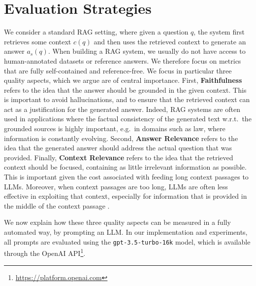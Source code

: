 \documentclass[11pt]{article}
\newcommand{\shahul}[1]{\textcolor{red}{#1}}
\begin{document}
\section{Evaluation Strategies}
\label{sec:eval}
We consider a standard RAG setting, where given a question $q$, the system first retrieves some context $c(q)$ and then uses the retrieved context to generate an answer $a_s(q)$. When building a RAG system, we usually do not have access to human-annotated datasets or reference answers. We therefore focus on metrics that are fully self-contained and reference-free. We focus in particular three quality aspects, which we argue are of central importance. First, \textbf{Faithfulness} refers to the idea that the answer should be grounded in the given context. This is important to avoid hallucinations, and to ensure that the retrieved context can act as a justification for the generated answer. 
Indeed, RAG systems are often used in applications where the factual consistency of the generated text w.r.t.\ the grounded sources is highly important, e.g.\ in domains such as law, where information is constantly evolving. Second, \textbf{Answer Relevance} refers to the idea that the generated answer should address the actual question that was provided.  Finally, \textbf{Context Relevance} refers to the idea that the retrieved context should be focused, containing as little irrelevant information as possible. This is important given the cost associated with feeding long context passages to LLMs. Moreover, when context passages are too long, LLMs are often less effective in exploiting that context, especially for information that is provided in the middle of the context passage \cite{liu2023lost}.

We now explain how these three quality aspects can be measured in a fully automated way, by prompting an LLM. In our implementation and experiments, all prompts are evaluated using the \texttt{gpt-3.5-turbo-16k} model, which is available through the OpenAI API\footnote{\url{https://platform.openai.com}}.


\end{document}
